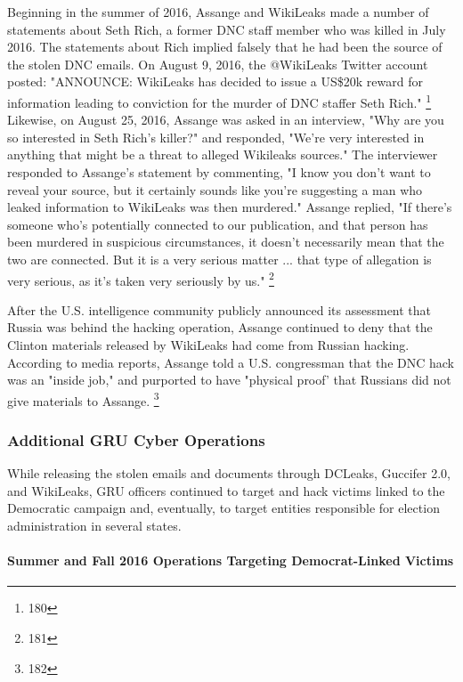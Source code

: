 Beginning in the summer of 2016, Assange and WikiLeaks made a number of statements about Seth Rich, a former DNC staff member who was killed in July 2016.
The statements about Rich implied falsely that he had been the source of the stolen DNC emails.
On August 9, 2016, the @WikiLeaks Twitter account posted: "ANNOUNCE: WikiLeaks has decided to issue a US\$20k reward for information leading to conviction for the murder of DNC staffer Seth Rich."%
\footnote{180}
Likewise, on August 25, 2016, Assange was asked in an interview, "Why are you so interested in Seth Rich's killer?" and responded, "We're very interested in anything that might be a threat to alleged Wikileaks sources."
The interviewer responded to Assange's statement by commenting, "I know you don't want to reveal your source, but it certainly sounds like you're suggesting a man who leaked information to WikiLeaks was then murdered."
Assange replied, "If there's someone who's potentially connected to our publication, and that person has been murdered in suspicious circumstances, it doesn't necessarily mean that the two are connected.
But it is a very serious matter ... that type of allegation is very serious, as it's taken very seriously by us."%
\footnote{181}

After the U.S. intelligence community publicly announced its assessment that Russia was behind the hacking operation, Assange continued to deny that the Clinton materials released by WikiLeaks had come from Russian hacking.
According to media reports, Assange told a U.S. congressman that the DNC hack was an "inside job," and purported to have "physical proof' that Russians did not give materials to Assange.%
\footnote{182}

\subsubsection{Additional GRU Cyber Operations}

While releasing the stolen emails and documents through DCLeaks, Guccifer 2.0, and WikiLeaks, GRU officers continued to target and hack victims linked to the Democratic campaign and, eventually, to target entities responsible for election administration in several states.

\paragraph{Summer and Fall 2016 Operations Targeting Democrat-Linked Victims}

